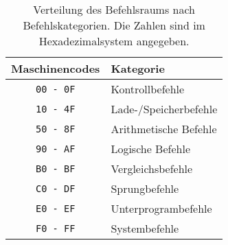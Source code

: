 \begin{table}
  \centering
  \begin{tabular}{|c|l|}                        \hline
    Maschinencodes   & Kategorie              \\\hline\hline
    \texttt{00 - 0F} & Kontrollbefehle        \\
    \texttt{10 - 4F} & Lade-/Speicherbefehle  \\
    \texttt{50 - 8F} & Arithmetische Befehle  \\
    \texttt{90 - AF} & Logische Befehle       \\
    \texttt{B0 - BF} & Vergleichsbefehle      \\
    \texttt{C0 - DF} & Sprungbefehle          \\
    \texttt{E0 - EF} & Unterprogrambefehle    \\
    \texttt{F0 - FF} & Systembefehle          \\\hline
  \end{tabular}
  \caption[Verteilung des Befehlsraums]
          {Verteilung des Befehlsraums nach Befehlskategorien.
          Die Zahlen sind im Hexadezimalsystem angegeben.}
  \label{tab:Befehlraumverteilung}
\end{table}


